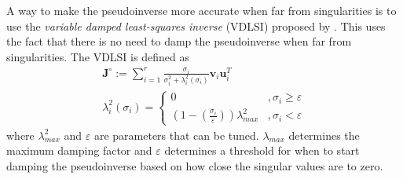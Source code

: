 A way to make the pseudoinverse more accurate when far from singularities is to
use the \emph{variable damped least-squares inverse} (VDLSI) proposed by \cite{chiaverini1997}.
This uses the fact that there is no need to damp the pseudoinverse when far from singularities.
The VDLSI is defined as
\begin{subequations}
\begin{align}
    \bm{J}^{\circ} := \sum_{i=1}^r \frac{\sigma_i}{\sigma_i^2 + \lambda_i^2(\sigma_i)} \bm{v}_i \bm{u}_i^T \\
    \lambda_i^2(\sigma_i) = \begin{cases}
        0 & ,\sigma_i \geq \varepsilon \\
        \left(1-\left(\frac{\sigma_i}{\varepsilon}\right)\right)\lambda_{max}^2 & ,\sigma_i < \varepsilon
    \end{cases}
\end{align}
\end{subequations}
where $\lambda_{max}^2$ and $\varepsilon$ are parameters that can be tuned. $\lambda_{max}$
determines the maximum damping factor and $\varepsilon$ determines a threshold for when
to start damping the pseudoinverse based on how close the singular values are to zero.
